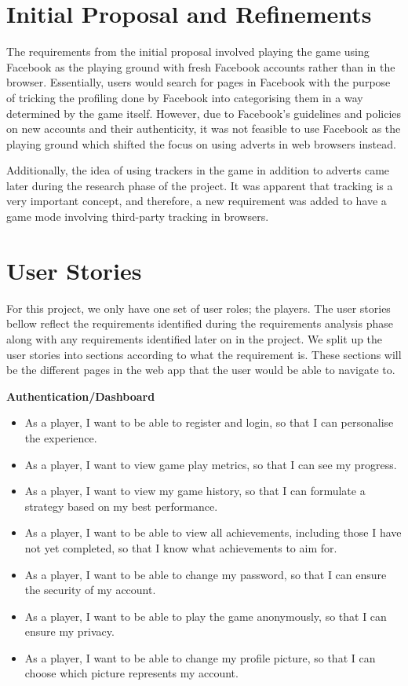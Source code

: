 \documentclass{l4proj}
\begin{document}
\section{Initial Proposal and Refinements}
The requirements from the initial proposal involved playing the game using Facebook as the playing ground with fresh Facebook accounts rather than in the browser. Essentially, users would search for pages in Facebook with the purpose of tricking the profiling done by Facebook into categorising them in a way determined by the game itself. However, due to Facebook's guidelines and policies on new accounts and their authenticity, it was not feasible to use Facebook as the playing ground which shifted the focus on using adverts in web browsers instead.

Additionally, the idea of using trackers in the game in addition to adverts came later during the research phase of the project. It was apparent that tracking is a very important concept, and therefore, a new requirement was added to have a game mode involving third-party tracking in browsers.

\section{User Stories}
For this project, we only have one set of user roles; the players. The user stories bellow reflect the requirements identified during the requirements analysis phase along with any requirements identified later on in the project. We split up the user stories into sections according to what the requirement is. These sections will be the different pages in the web app that the user would be able to navigate to.

\textbf{Authentication/Dashboard}
\begin{itemize}
    \item As a player, I want to be able to register and login, so that I can personalise the experience.
    \item As a player, I want to view game play metrics, so that I can see my progress.
    \item As a player, I want to view my game history, so that I can formulate a strategy based on my best performance.
    \item As a player, I want to be able to view all achievements, including those I have not yet completed, so that I know what achievements to aim for.
    \item As a player, I want to be able to change my password, so that I can ensure the security of my account.
    \item As a player, I want to be able to play the game anonymously, so that I can ensure my privacy.
    \item As a player, I want to be able to change my profile picture, so that I can choose which picture represents my account.
\end{itemize}
\end{document}
